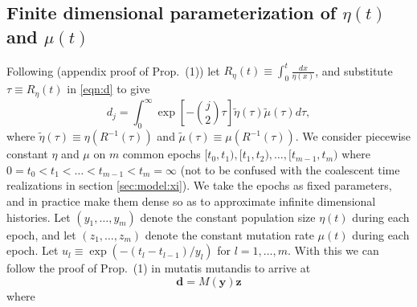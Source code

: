 \documentclass[11pt]{article}
\begin{document}
\subsection{Finite dimensional parameterization of $\eta(t)$ and $\mu(t)$}\label{sec:model:pcsws}


Following \cite{Rosen2018-bb} (appendix proof of Prop.\ (1)) let $R_\eta(t) \equiv \int_0^t\frac{dx}{\eta(x)}$, and substitute $\tau \equiv R_\eta(t)$ in \eqref{eqn:d} to give
\begin{equation}
\label{eqn:d2}
d_j = \int_0^\infty \exp\left[-\binom{j}{2}\tau\right] \tilde\eta(\tau)\tilde\mu(\tau)d\tau,
\end{equation}
where $\tilde\eta(\tau) \equiv \eta(R^{-1}(\tau))$ and $\tilde\mu(\tau) \equiv \mu(R^{-1}(\tau))$.
We consider piecewise constant $\eta$ and $\mu$ on $m$ common epochs $[t_0, t_1), [t_1, t_2),\dots, [t_{m-1}, t_m)$ where $0=t_0 < t_1 < \dots < t_{m-1} < t_m=\infty$ (not to be confused with the coalescent time realizations in section \ref{sec:model:xi}).
We take the epochs as fixed parameters, and in practice make them dense so as to approximate infinite dimensional histories.
Let $(y_1,\dots,y_m)$ denote the constant population size $\eta(t)$ during each epoch, and let $(z_1,\dots,z_m)$ denote the constant mutation rate $\mu(t)$ during each epoch.
Let $u_l \equiv \exp(-(t_l-t_{l-1})/y_l)$ for $l=1,\dots,m$. %
With this we can follow the proof of Prop.\ (1) in \cite{Rosen2018-bb} mutatis mutandis to arrive at
\begin{equation}
\label{eqn:d3}
\boldsymbol d = M(\boldsymbol y) \boldsymbol z
\end{equation}
where
\end{document}
